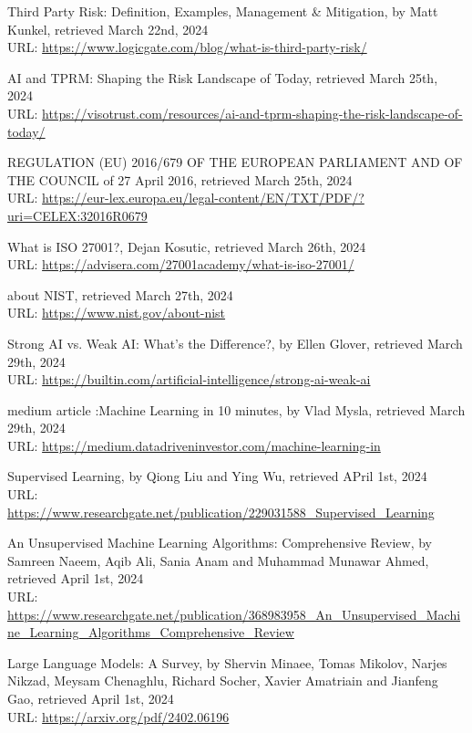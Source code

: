 \begin{thebibliography}{9}
Third Party Risk: Definition, Examples, Management \& Mitigation, by Matt Kunkel, retrieved March 22nd, 2024 \\
URL: \url{https://www.logicgate.com/blog/what-is-third-party-risk/}


AI and TPRM: Shaping the Risk Landscape of Today, retrieved March 25th, 2024 \\
URL: \url{https://visotrust.com/resources/ai-and-tprm-shaping-the-risk-landscape-of-today/}

REGULATION (EU) 2016/679 OF THE EUROPEAN PARLIAMENT AND OF THE COUNCIL of 27 April 2016, retrieved March 25th, 2024  \\
URL: \url{https://eur-lex.europa.eu/legal-content/EN/TXT/PDF/?uri=CELEX:32016R0679}

What is ISO 27001?, Dejan Kosutic, retrieved March 26th, 2024 \\
URL: \url{https://advisera.com/27001academy/what-is-iso-27001/}



about NIST, retrieved March 27th, 2024 \\
URL: \url{https://www.nist.gov/about-nist}


Strong AI vs. Weak AI: What’s the Difference?, by Ellen Glover, retrieved March 29th, 2024 \\
URL: \url{https://builtin.com/artificial-intelligence/strong-ai-weak-ai}


medium article :Machine Learning in 10 minutes, by Vlad Mysla, retrieved March 29th, 2024 \\
URL: \url{https://medium.datadriveninvestor.com/machine-learning-in}

Supervised Learning, by Qiong Liu and Ying Wu, retrieved APril 1st, 2024 \\
URL: \url{https://www.researchgate.net/publication/229031588_Supervised_Learning}


An Unsupervised Machine Learning Algorithms: Comprehensive Review, by Samreen Naeem, Aqib Ali, Sania Anam and Muhammad Munawar Ahmed, retrieved April 1st, 2024 \\
URL: \url{https://www.researchgate.net/publication/368983958_An_Unsupervised_Machine_Learning_Algorithms_Comprehensive_Review}


Large Language Models: A Survey, by  Shervin Minaee, Tomas Mikolov, Narjes Nikzad, Meysam Chenaghlu, Richard Socher, Xavier Amatriain and Jianfeng Gao, retrieved April 1st, 2024 \\
URL: \url{https://arxiv.org/pdf/2402.06196}



\end{thebibliography}
